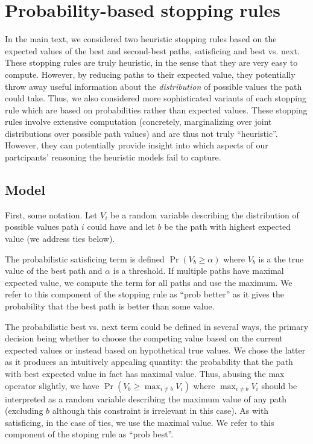 \section{Probability-based stopping rules}\label{app:planning-probstop}
In the main text, we considered two heuristic stopping rules based on the expected values of the best and second-best paths, satisficing and best vs. next. These stopping rules are truly heuristic, in the sense that they are very easy to compute. However, by reducing paths to their expected value, they potentially throw away useful information about the \emph{distribution} of possible values the path could take. Thus, we also considered more sophisticated variants of each stopping rule which are based on probabilities rather than expected values. These stopping rules involve extensive computation (concretely, marginalizing over joint distributions over possible path values) and are thus not truly ``heuristic''. However, they can potentially provide insight into which aspects of our partcipants' reasoning the heuristic models fail to capture.

\subsection{Model}
First, some notation. Let $V_i$ be a random variable describing the distribution of possible values path $i$ could have and let $b$ be the path with highest expected value (we address ties below). 

The probabilistic satisficing term is defined $\Pr(V_{b} \geq \alpha)$ where $V_{b}$ is a the true value of the best path and $\alpha$ is a threshold. If multiple paths have maximal expected value, we compute the term for all paths and use the maximum. We refer to this component of the stopping rule as ``prob better'' as it gives the probability that the best path is better than some value.

The probabilistic best vs. next term could be defined in several ways, the primary decision being whether to choose the competing value based on the current expected values or instead based on hypothetical true values. We chose the latter as it produces an intuitively appealing quantity: the probability that the path with best expected value in fact has maximal value. Thus, abusing the max operator slightly, we have $\Pr(V_{b} \geq \max_{i \neq b} V_i)$ where $\max_{i \neq b} V_i$ should be interpreted as a random variable describing the maximum value of any path (excluding $b$ although this constraint is irrelevant in this case). As with satisficing, in the case of ties, we use the maximal value. We refer to this component of the stoping rule as ``prob best''.

